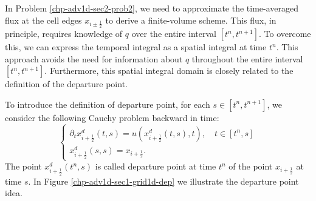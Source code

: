 In Problem \ref{chp-adv1d-sec2-prob2}, we need to approximate the time-averaged flux at the cell edges $x_{i\pm\frac{1}{2}}$
to derive a finite-volume scheme. This flux, in principle, requires knowledge of $q$ over the entire interval $[t^n, t^{n+1}]$. 
To overcome this, we can express the temporal integral as a spatial integral at time $t^n$. 
This approach avoids the need for information about $q$ throughout the entire interval $[t^n, t^{n+1}]$. 
Furthermore, this spatial integral domain is closely related to the definition of the 
departure point. 

To introduce the definition of departure point, for each $s \in [t^n,t^{n+1}]$,
we consider the following Cauchy problem backward in time:
\begin{equation}
	\label{chp-sec-flux:analysis-eq3}
	\begin{cases}
		\partial_t x^d_{i+\frac{1}{2}} (t,s) = u(x^d_{i+\frac{1}{2}}(t,s) ,t),\quad t\in[t^{n},s] \\
		x^d_{i+\frac{1}{2}}(s,s) = x_{i+\frac{1}{2}}.
	\end{cases}
\end{equation}
The point $x^d_{i+\frac{1}{2}}(t^n,s)$ is called departure point at time $t^n$
of the point $x_{i+\frac{1}{2}}$ at time $s$.
In Figure \ref{chp-adv1d-sec1-grid1d-dep} we illustrate the departure point idea.


